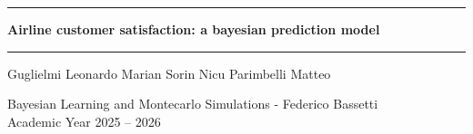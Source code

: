 \documentclass[10pt, a4paper]{article}
\begin{document}
\thispagestyle{empty}
\vspace*{\fill}

\begin{center}
    {\color{polinavy}\rule{\textwidth}{2.2pt}}\par\vspace{1.0ex}
    {\Huge\bfseries\color{polinavy} Airline customer satisfaction: a bayesian prediction model\par}
    \vspace{0.8ex}
    \vspace{0.6ex}
    {\color{polinavy}\rule{\textwidth}{0.8pt}}\par\vspace{1.4ex}
    {\normalsize
      Guglielmi Leonardo \quad\textbullet\quad Marian Sorin Nicu \quad\textbullet\quad Parimbelli Matteo \par}
    \vspace{0.3ex}
    {\footnotesize\color{polinavy!80}
      Bayesian Learning and Montecarlo Simulations - Federico Bassetti \\
      Academic Year 2025 -- 2026\par}
    \vspace{1.6ex}
\end{center}

\begin{abstract}
In this project we define and fit a Bayesian prediction model for the
satisfaction level of customers of an undisclosed airline, based on a set of
flight characteristics. Model parameters are derived using MCMC methods via the
JAGS tool. We compare a logistic regression under weakly informative priors
against a horseshoe shrinkage prior over 22 predictors, assess both with WAIC
and PSIS-LOO, and validate the selected model on a held-out set of
\num{128274} customers.
\end{abstract}

\vspace*{\fill}
\newpage

\thispagestyle{empty}
\tableofcontents
\newpage
{}








\begin{appendices}




\end{appendices}

\printbibliography
\end{document}
